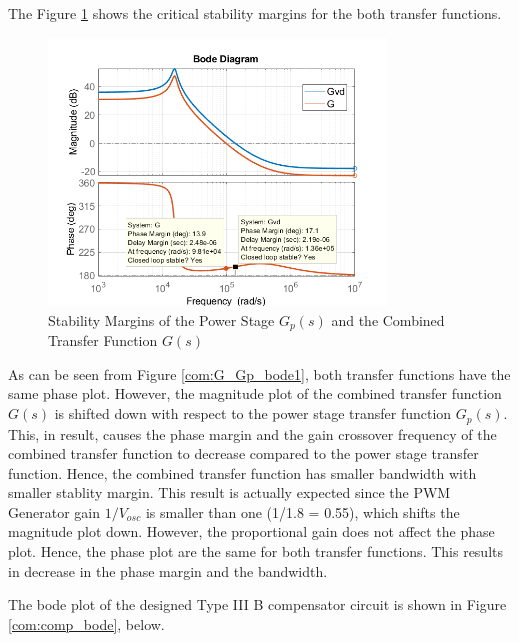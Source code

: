 The Figure \ref{com:G_Gp_bode2} shows the critical stability margins for the both transfer functions.

\begin{figure}[H]
\begin{center}
\includegraphics[width=0.8\textwidth]{bode_plots/G_Gp_bode2.png}
\caption{Stability Margins of the Power Stage $G_p(s)$ and the Combined Transfer Function $G(s)$}
\label{com:G_Gp_bode2}
\end{center}
\end{figure}

As can be seen from Figure \ref{com:G_Gp_bode1}, both transfer functions have the same phase plot. However, the magnitude plot of the combined transfer function $G(s)$ is shifted down with respect to the power stage transfer function $G_p(s)$. This, in result, causes the phase margin and the gain crossover frequency of the combined transfer function to decrease compared to the power stage transfer function. Hence, the combined transfer function has smaller bandwidth with smaller stablity margin. This result is actually expected since the PWM Generator gain $1/V_{osc}$ is smaller than one (1/1.8 = 0.55), which shifts the magnitude plot down. However, the proportional gain does not affect the phase plot. Hence, the phase plot are the same for both transfer functions. This results in decrease in the phase margin and the bandwidth.

The bode plot of the designed Type III B compensator circuit is shown in Figure \ref{com:comp_bode}, below.

